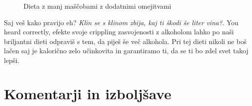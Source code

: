 \documentclass[a4paper]{article}
\begin{document}
\begin{figure}[H]
    \centering
    \caption{Dieta z manj maščobami z dodatnimi omejitvami}
    \label{fig:fat-add}
\end{figure}

Saj veš kako pravijo eh? \textit{Klin se s klinom zbija, kaj ti škodi še liter vina?}. You heard 
correctly, efekte svoje crippling zasvojenosti z alkoholom lahko po naši briljantni dieti odpraviš
s tem, da piješ še več alkohola. Pri tej dieti nikoli ne boš lačen saj je kalorično zelo učinkovita 
in garantiramo ti, da se ti bo zdel svet takoj lepši. \\


\section{Komentarji in izboljšave}

\newpage


\end{document}
